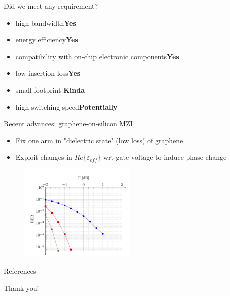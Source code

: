 \documentclass[handout,xcolor={usenames,dvipsnames},11pt]{beamer}
\begin{document}
\begin{frame}{Did we meet any requirement?}
    \pause
    \begin{itemize}
        \item high bandwidth\pause\qquad \textcolor{TolLightGreen}{\textbf{Yes}}\pause
        \item energy efficiency\pause\qquad \textcolor{TolLightGreen}{\textbf{Yes}}\pause
    \item compatibility with on-chip electronic components\pause\quad \textcolor{TolLightGreen}{\textbf{Yes}}\pause
        \item low insertion loss\pause\qquad \textcolor{TolLightGreen}{\textbf{Yes}}\pause
        \item small footprint \pause\qquad \alert{\textbf{Kinda}} \pause
        \item high switching speed\pause\qquad \alert{\textbf{Potentially}}
    \end{itemize}
\end{frame}
\begin{frame}{Recent advances: graphene-on-silicon MZI}
    \begin{itemize}
        \item Fix one arm in "dielectric state" (low loss) of graphene
        \item Exploit changes in $Re\{ \varepsilon_{eff}\}$ wrt gate voltage to induce phase change
    \end{itemize}
    \begin{figure}
        \centering
        \includegraphics[width=0.5\textwidth]{./images/BER}
        \caption{\cite{Phatak2016}}
    \end{figure}
\end{frame}

\appendix

\begin{frame}[allowframebreaks]{References}
  
  
\end{frame}

\begin{frame}[standout]
    Thank you!
\end{frame}
\end{document}
